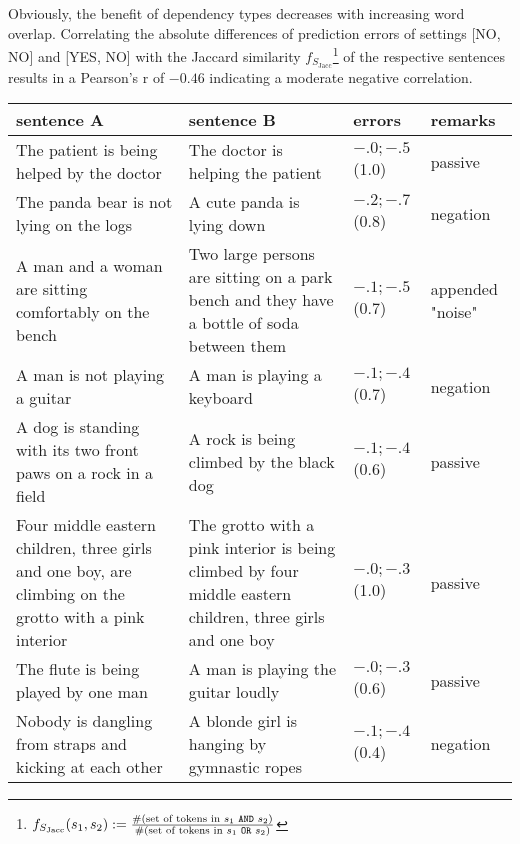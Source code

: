 Obviously, the benefit of dependency types decreases with increasing word overlap. Correlating the absolute differences of prediction errors of settings [NO, NO] and [YES, NO] with the Jaccard similarity $f_{S_\text{Jacc}}$\footnote{$f_{S_\text{Jacc}}(s_1, s_2) := \frac{\text{\#(set of tokens in $s_1$ \texttt{AND} $s_2$)}}{\text{\#(set of tokens in $s_1$ \texttt{OR} $s_2$)}}$} of the respective sentences results in a Pearson's r of $-0.46$ indicating a moderate negative correlation.

\begin{table}[htb!]
	\centering
	\begin{tabularx}{\textwidth}{p{}|p{}|X|X} 
		\hline
		sentence A & sentence B & errors & remarks \\ \hline \hline
		The patient is being helped by the doctor & The doctor is helping the patient & $-.0;-.5$ (1.0) & passive \\ \hline
		The panda bear is not lying on the logs & A cute panda is lying down & $-.2;-.7$ (0.8) & negation \\ \hline
		A man and a woman are sitting comfortably on the bench & Two large persons are sitting on a park bench and they have a bottle of soda between them & $-.1;-.5$ (0.7) & appended "noise" \\ \hline
		A man is not playing a guitar & A man is playing a keyboard & $-.1;-.4$ (0.7) & negation \\ \hline
		A dog is standing with its two front paws on a rock in a field & A rock is being climbed by the black dog & $-.1;-.4$ (0.6) & passive \\ \hline
		Four middle eastern children, three girls and one boy, are climbing on the grotto with a pink interior & The grotto with a pink interior is being climbed by four middle eastern children, three girls and one boy & $-.0;-.3$ (1.0) & passive \\ \hline
		The flute is being played by one man & A man is playing the guitar loudly & $-.0;-.3$ (0.6) & passive \\ \hline
		Nobody is dangling from straps and kicking at each other & A blonde girl is hanging by gymnastic ropes & $-.1;-.4$ (0.4) & negation \\ \hline

\end{tabularx}
\end{table}
